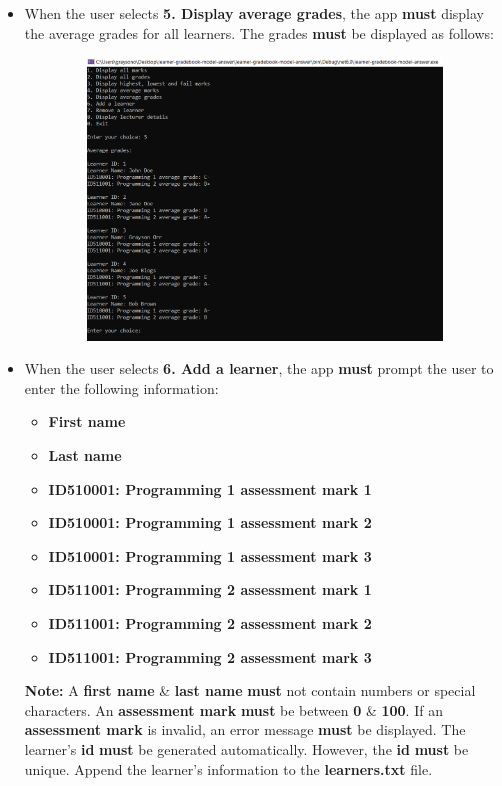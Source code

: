 \documentclass{article}
\begin{document}
\begin{itemize}
\begin{figure}[ht]
    \end{figure}
    \item When the user selects \textbf{5. Display average grades}, the app \textbf{must} display the average grades for all learners. The grades \textbf{must} be displayed as follows:
    \begin{figure}[ht]
        \centering
        \includegraphics[width=150mm,height=75mm]{../../resources/img/project-1/6.PNG}
    \end{figure}
    \newpage
    \item When the user selects \textbf{6. Add a learner}, the app \textbf{must} prompt the user to enter the following information:
    \begin{itemize}
        \item \textbf{First name}
        \item \textbf{Last name}
        \item \textbf{ID510001: Programming 1 assessment mark 1}
        \item \textbf{ID510001: Programming 1 assessment mark 2}
        \item \textbf{ID510001: Programming 1 assessment mark 3}
        \item \textbf{ID511001: Programming 2 assessment mark 1}
        \item \textbf{ID511001: Programming 2 assessment mark 2}
        \item \textbf{ID511001: Programming 2 assessment mark 3}
    \end{itemize}
    \textbf{Note:} A \textbf{first name} \& \textbf{last name} \textbf{must} not contain numbers or special characters. An \textbf{assessment mark} \textbf{must} be between \textbf{0} \& \textbf{100}. If an \textbf{assessment mark} is invalid, an error message \textbf{must} be displayed. The learner's \textbf{id} \textbf{must} be generated automatically. However, the \textbf{id} \textbf{must} be unique. Append the learner's information to the \textbf{learners.txt} file.  

\end{itemize}
\end{document}
